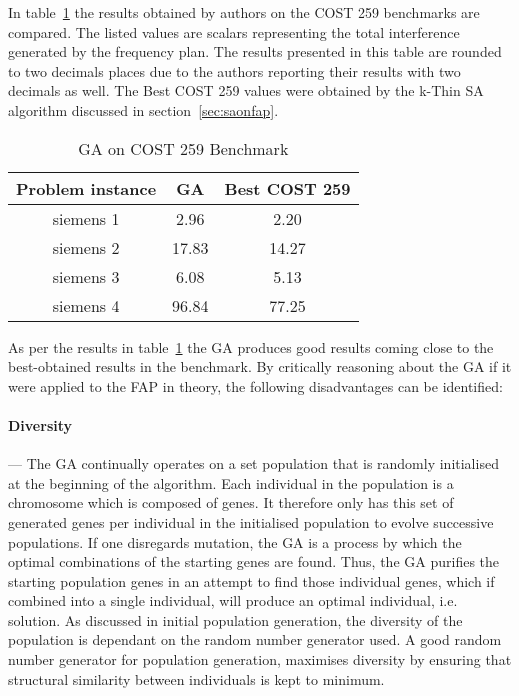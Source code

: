 In table~\ref{tab:GA} the results obtained by authors on the \gls{COST} 259 benchmarks are compared. The listed values are scalars representing the total interference generated by the frequency plan. The results presented in this table are rounded to two decimals places due to the authors reporting their results with two decimals as well. The Best \gls{COST} 259 values were obtained by the k-Thin SA algorithm discussed in section~\ref{sec:saonfap}.
\begin{table}[H]
\centering
	\begin{tabular}{| c | c | c |}
	\hline
	Problem instance & \gls{GA} & Best \gls{COST} 259 \\ \hline
	siemens 1 & 2.96 & 2.20 \\ \hline
	siemens 2 & 17.83 & 14.27 \\ \hline
	siemens 3 & 6.08 & 5.13 \\ \hline
	siemens 4 & 96.84 & 77.25 \\ \hline
	\end{tabular}
\caption{GA on \gls{COST} 259 Benchmark}
\label{tab:GA}
\end{table}

As per the results in table~\ref{tab:GA} the \gls{GA} produces good results coming close to the best-obtained results in the benchmark. By critically reasoning about the \gls{GA} if it were applied to the \gls{FAP} in theory, the following disadvantages can be identified:

\paragraph{Diversity}
--- The \gls{GA} continually operates on a set population that is randomly initialised at the beginning of the algorithm. Each individual in the population is a chromosome which is composed of genes. It therefore only has this set of generated genes per individual in the initialised population to evolve successive populations.
If one disregards mutation, the \gls{GA} is a process by which the optimal combinations of the starting genes are found. Thus, the \gls{GA} purifies the starting population genes in an attempt to find those individual genes, which if combined into a single individual, will produce an optimal individual, i.e. solution. As discussed in initial population generation, the diversity of the population is dependant on the random number generator used. A good random number generator for population generation, maximises diversity by ensuring that structural similarity between individuals is kept to minimum.
